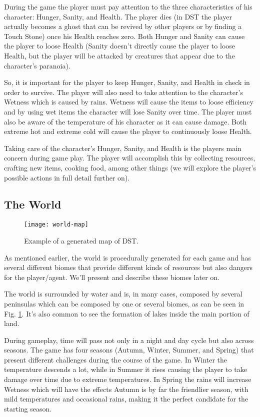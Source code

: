 During the game the player must pay attention to the three characteristics of his character: Hunger, Sanity, and Health.
The player dies (in \ac{DST} the player actually becomes a ghost that can be revived by other players or by finding a Touch Stone) once his Health reaches zero.
Both Hunger and Sanity can cause the player to loose Health (Sanity doesn't directly cause the player to loose Health, but the player will be attacked by creatures that appear due to the character's paranoia).

So, it is important for the player to keep Hunger, Sanity, and Health in check in order to survive.
The player will also need to take attention to the character's Wetness which is caused by rains.
Wetness will cause the items to loose efficiency and by using wet items the character will lose Sanity over time.
The player must also be aware of the temperature of his character as it can cause damage.
Both extreme hot and extreme cold will cause the player to continuously loose Health.

Taking care of the character's Hunger, Sanity, and Health is the players main concern during game play.
The player will accomplish this by collecting resources, crafting new items, cooking food, among other things (we will explore the player's possible actions in full detail further on).

\subsection{The World}

\begin{figure}
  \centering
    \texttt{[image: world-map]}
  \caption{Example of a generated map of \ac{DST}.}
  \label{fig:world-map}
\end{figure}

As mentioned earlier, the world is procedurally generated for each game and has several different biomes that provide different kinds of resources but also dangers for the player/agent. 
We'll present and describe these biomes later on.

The world is surrounded by water and is, in many cases, composed by several peninsulas which can be composed by one or several biomes, as can be seen in Fig. \ref{fig:world-map}.
It's also common to see the formation of lakes inside the main portion of land.

During gameplay, time will pass not only in a night and day cycle but also across seasons.
The game has four seasons (Autumn, Winter, Summer, and Spring) that present different challenges during the course of the game.
In Winter the temperature descends a lot, while in Summer it rises causing the player to take damage over time due to extreme temperatures.
In Spring the rains will increase Wetness which will have the effects 
Autumn is by far the friendlier season, with mild temperatures and occasional rains, making it the perfect candidate for the starting season.

